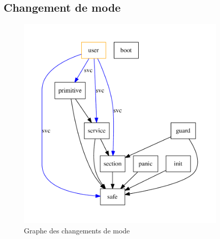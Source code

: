 \subsection{Changement de mode}

\begin{figure}[t]
  \centering
  \includegraphics[width=10cm]{chapitres/changement-modes.pdf}
%
  \caption{Graphe des changements de mode}
  \ligne
\end{figure}

